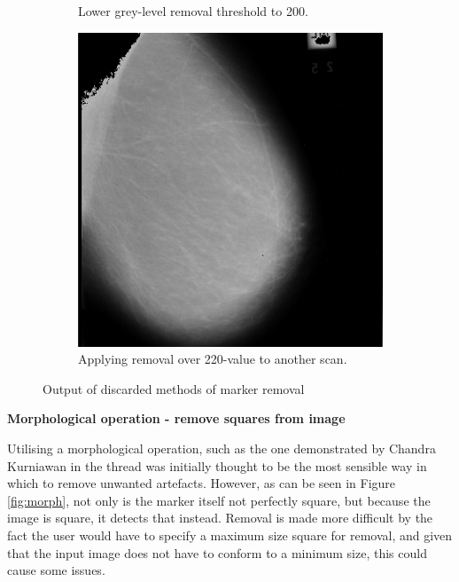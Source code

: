 \begin{figure}[H]
\begin{subfigure}[t]{0.3\textwidth}
      \caption{Lower grey-level removal threshold to 200.}
      \label{fig:remove-white-200}
    \end{subfigure} \hfill
    \begin{subfigure}[t]{0.3\textwidth}
      \includegraphics[width=\textwidth]{Chapter2/technical-img/other-scan.png}
      \caption{Applying removal over 220-value to another scan.}
      \label{fig:remove-other-scan}
    \end{subfigure}
    \caption{Output of discarded methods of marker removal}
    \label{fig:marker-removal-discards}
\end{figure}

\noindent \textbf{Morphological operation - remove squares from image}

Utilising a morphological operation, such as the one demonstrated by Chandra Kurniawan in the thread \cite{detect_square} was initially thought to be the most sensible way in which to remove unwanted artefacts. However, as can be seen in Figure \ref{fig:morph}, not only is the marker itself not perfectly square, but because the image is square, it detects that instead. Removal is made more difficult by the fact the user would have to specify a maximum size square for removal, and given that the input image does not have to conform to a minimum size, this could cause some issues.

